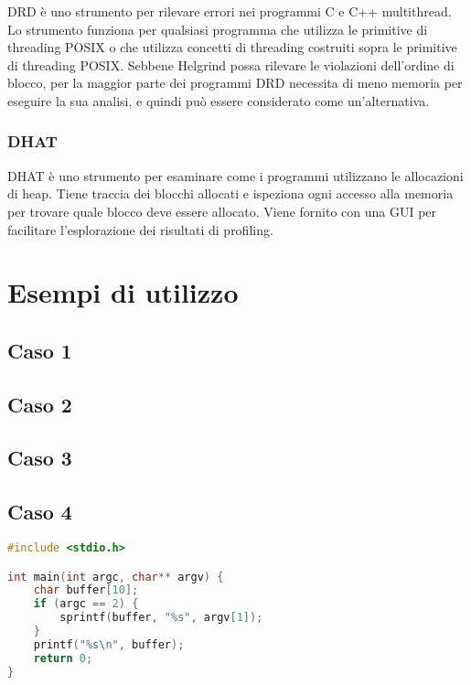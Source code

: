 \documentclass{article}
\begin{document}
DRD è uno strumento per rilevare errori nei programmi C e C++ multithread. Lo
strumento funziona per qualsiasi programma che utilizza le primitive di
threading POSIX o che utilizza concetti di threading costruiti sopra le
primitive di threading POSIX. Sebbene Helgrind possa rilevare le violazioni
dell'ordine di blocco, per la maggior parte dei programmi DRD necessita di meno
memoria per eseguire la sua analisi, e quindi può essere considerato come
un'alternativa.

\subsubsection{DHAT}

DHAT è uno strumento per esaminare come i programmi utilizzano le allocazioni di
heap. Tiene traccia dei blocchi allocati e ispeziona ogni accesso alla memoria
per trovare quale blocco deve essere allocato. Viene fornito con una GUI per
facilitare l'esplorazione dei risultati di profiling.


\newpage
\section{Esempi di utilizzo}

\subsection{Caso 1}
\label{sec:caso1}

\newpage
\subsection{Caso 2}
\label{sec:caso2}

\newpage
\subsection{Caso 3}
\label{sec:caso3}

\newpage
\subsection{Caso 4}
\label{sec:caso4}

\begin{lstlisting}[language=c]
#include <stdio.h>

int main(int argc, char** argv) {
    char buffer[10];
    if (argc == 2) {
        sprintf(buffer, "%s", argv[1]);
    }
    printf("%s\n", buffer);
    return 0;
}
\end{lstlisting}
\end{document}

